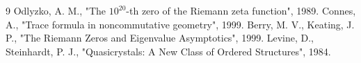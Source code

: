 \documentclass[11pt, a4paper]{article}
\begin{document}
	\begin{thebibliography}{9}
		Odlyzko, A. M., "The $10^{20}$-th zero of the Riemann zeta function", 1989.
		Connes, A., "Trace formula in noncommutative geometry", 1999.
		Berry, M. V., Keating, J. P., "The Riemann Zeros and Eigenvalue Asymptotics", 1999.
		Levine, D., Steinhardt, P. J., "Quasicrystals: A New Class of Ordered Structures", 1984.
	\end{thebibliography}
	
\end{document}
